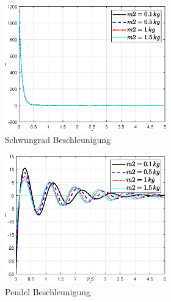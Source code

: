 \begin{figure}
\begin{figure}
\begin{subfigure}[b]{0.49 \linewidth}
        \includegraphics[width=\linewidth]{Bilder/5_sensi/fig/m2/phi_punkt_punkt.eps}
        \caption{Schwungrad Beschleunigung}
        \label{fig:m2_phi_punkt_punkt}
    \end{subfigure}
    \begin{subfigure}[b]{0.49 \linewidth}
        \includegraphics[width=\linewidth]{Bilder/5_sensi/fig/m2/theta_punkt_punkt.eps}
        \caption{Pendel Beschleunigung}
        \label{fig:m2_theta_punkt_punkt}
    \end{subfigure}
    \begin{subfigure}[b]{0.49\linewidth}

\end{subfigure}
\end{figure}
\end{figure}
